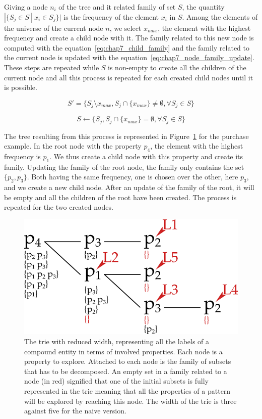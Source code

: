 Giving a node $n_i$ of the tree and it related family of set $S$, the quantity $|\{S_j \in S ~|~ x_i \in S_j \}|$ is the frequency of the element $x_i$ in $S$. Among the elements of the universe of the current node $n$, we select $x_{max}$, the element with the highest frequency and create a child node with it. The family related to this new node is computed with the equation~\eqref{eq:chap7_child_family} and the family related to the current node is updated with the equation~\eqref{eq:chap7_node_family_update}. These steps are repeated while $S$ is non-empty to create all the children of the current node and all this process is repeated for each created child nodes until it is possible.

\begin{equation}
S' = \{S_j \setminus x_{max}, S_j \cap \{x_{max}\} \neq \emptyset, \forall S_j \in S\}
\label{eq:chap7_child_family}
\end{equation}

\begin{equation}
S \leftarrow \{S_j, S_j \cap \{x_{max}\} = \emptyset, \forall S_j \in S\}
\label{eq:chap7_node_family_update}
\end{equation}

The tree resulting from this process is represented in Figure~\ref{fig:chap7_advanced} for the purchase example. In the root node with the property $p_4$, the element with the highest frequency is $p_1$. We thus create a child node with this property and create its family. Updating the family of the root node, the family only contains the set $\{p_2, p_3\}$. Both having the same frequency, one is chosen over the other, here $p_3$, and we create a new child node. After an update of the family of the root, it will be empty and all the children of the root have been created. The process is repeated for the two created nodes.

\begin{figure}[ht!]
\centering
\includegraphics[scale=0.45]{figures/chapter7/advanced.png}
\caption{\label{fig:chap7_advanced} The trie with reduced width, representing all the labels of a compound entity in terms of involved properties. Each node is a property to explore. Attached to each node is the family of subsets that has to be decomposed. An empty set in a family related to a node (in red) signified that one of the initial subsets is fully represented in the trie meaning that all the properties of a pattern will be explored by reaching this node. The width of the trie is three against five for the naive version.}
\end{figure}

